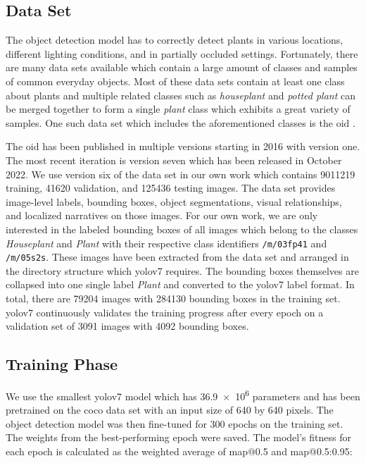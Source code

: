 \documentclass[draft,final]{vutinfth} %
\begin{document}
\subsection{Data Set}
\label{ssec:obj-train-dataset}

The object detection model has to correctly detect plants in various
locations, different lighting conditions, and in partially occluded
settings. Fortunately, there are many data sets available which
contain a large amount of classes and samples of common everyday
objects. Most of these data sets contain at least one class about
plants and multiple related classes such as \emph{houseplant} and
\emph{potted plant} can be merged together to form a single
\emph{plant} class which exhibits a great variety of samples. One such
data set which includes the aforementioned classes is the \gls{oid}
\cite{kuznetsova2020,krasin2017}.

The \gls{oid} has been published in multiple versions starting in 2016
with version one. The most recent iteration is version seven which has
been released in October 2022. We use version six of the data set in
our own work which contains \num{9011219} training, \num{41620}
validation, and \num{125436} testing images. The data set provides
image-level labels, bounding boxes, object segmentations, visual
relationships, and localized narratives on those images. For our own
work, we are only interested in the labeled bounding boxes of all
images which belong to the classes \emph{Houseplant} and \emph{Plant}
with their respective class identifiers \texttt{/m/03fp41} and
\texttt{/m/05s2s}. These images have been extracted from the data set
and arranged in the directory structure which \gls{yolo}v7
requires. The bounding boxes themselves are collapsed into one single
label \emph{Plant} and converted to the \gls{yolo}v7 label format. In
total, there are \num{79204} images with \num{284130} bounding boxes
in the training set. \gls{yolo}v7 continuously validates the training
progress after every epoch on a validation set of \num{3091} images
with \num{4092} bounding boxes.

\subsection{Training Phase}
\label{ssec:obj-training-phase}

We use the smallest \gls{yolo}v7 model which has \num{36.9e6}
parameters \cite{wang2022} and has been pretrained on the \gls{coco}
data set \cite{lin2015} with an input size of \num{640} by \num{640}
pixels. The object detection model was then fine-tuned for \num{300}
epochs on the training set. The weights from the best-performing epoch
were saved. The model's fitness for each epoch is calculated as the
weighted average of \gls{map}@0.5 and \gls{map}@0.5:0.95:
\end{document}

